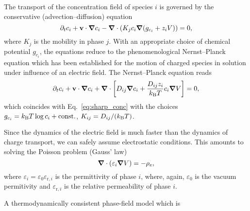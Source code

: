 \documentclass[preprint,pre,superscriptaddress]{revtex4-1}
\renewcommand{\v}[1]{\ensuremath{\mathbf{#1}}} %
\newcommand{\gv}[1]{\ensuremath{\mbox{\boldmath$ #1 $}}}
\newcommand{\grad}[1]{\gv{\nabla} #1} %
\renewcommand{\div}[1]{\gv{\nabla} \cdot #1} %
\newcommand{\pdt}[1]{\partial_t #1}
\begin{document}
The transport of the concentration field of species $i$ is governed by the conservative (advection--diffusion) equation
\begin{equation}
  \pdt c_i + \v v \cdot \grad c_i - \div (K_{j} c_i \grad (g_{c_i} + z_i V)) = 0,
  \label{eq:sharp_conc}
\end{equation}
where $K_{j}$ is the mobility in phase $j$.
With an appropriate choice of chemical potential $g_{c_i}$, the equations reduce to the phenomenological Nernst--Planck equation which has been established for the motion of charged species in solution under influence of an electric field. The Nernst--Planck equation reads
\begin{equation}
  \pdt c_i + \v v \cdot \grad c_i + \div \left[ D_{ij} \grad c_i + \frac{D_{ij} z_i}{k_{\rm B} T} c_i \grad V \right] = 0,
  \label{eq:nernst-planck}
\end{equation}
which coincides with Eq.~\eqref{eq:sharp_conc} with the choices $g_{c_i} = k_{\rm B} T \log c_i + \textrm{const.}$, $K_{ij} = D_{ij}/(k_{\rm B} T)$.

Since the dynamics of the electric field is much faster than the dynamics of charge transport, we can safely assume electrostatic conditions.
This amounts to solving the Poisson problem (Gauss' law)
\begin{equation}
  \div ( \varepsilon_i \grad V ) = - \rho_e,
\end{equation}
where $\varepsilon_i = \varepsilon_0 \varepsilon_{\textrm{r}, i}$ is the permittivity of phase $i$, where, again, $\varepsilon_0$ is the vacuum permitivity and $\varepsilon_{\textrm{r}, i}$ is the relative permeability of phase $i$. 

A thermodynamically consistent phase-field model which is






\end{document}
